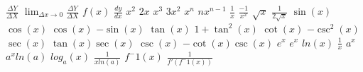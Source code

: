 \documentclass{article}
\begin{document}
$\frac{\Delta Y}{\Delta X}$
$\lim_{\Delta x \to 0} \frac{\Delta Y}{\Delta X}$
$f(x)$
$\frac{dy}{dx}$
$x^2$
$2x$
$x^3$
$3x^2$
$x^n$
$nx^{n-1}$
$\frac{1}{x}$
$\frac{-1}{x^2}$
$\sqrt{x}$
$\frac{1}{2 \sqrt{x}}$
$\sin(x)$
$\cos (x)$
$\cos(x)$
$-\sin (x)$
$\tan(x)$
$1 + \tan^2 (x)$
$\cot(x)$
$-\csc^2 (x)$
$\sec(x)$
$\tan(x) \sec(x)$
$\csc(x)$
$-\cot(x) \csc(x)$
$e^x$
$e^x$
$ln(x)$
$\frac{1}{x}$
$a^x$
$a^x ln(a)$
$log_a(x)$
$\frac{1}{x ln(a)}$
$f^-1(x)$
$\frac{1}{f'(f^-1(x))}$
\end{document}
